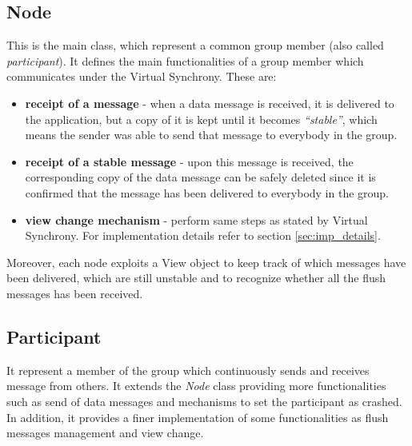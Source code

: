 \documentclass[11pt]{article}
\begin{document}
	\subsection{Node}
	This is the main class, which represent a common group member (also called \textit{participant}). It defines the main functionalities of a group member which communicates under the Virtual Synchrony. These are:
	\begin{itemize}
		\item \textbf{receipt of a message} - when a data message is received, it is delivered to the application, but a copy of it is kept until it becomes \textit{``stable''}, which means the sender was able to send that message to everybody in the group.
		\item \textbf{receipt of a stable message} - upon this message is received, the corresponding copy of the data message can be safely deleted since it is confirmed that the message has been delivered to everybody in the group.
		\item \textbf{view change mechanism} - perform same steps as stated by Virtual Synchrony. For implementation details refer to section \ref{sec:imp_details}.
	\end{itemize}
	Moreover, each node exploits a View object to keep track of which messages have been delivered, which are still unstable and to recognize whether all the flush messages has been received.
	
	\subsection{Participant}
	It represent a member of the group which continuously sends and receives message from others. It extends the \textit{Node} class providing more functionalities such as send of data messages and mechanisms to set the participant as crashed. In addition, it provides a finer implementation of some functionalities as flush messages management and view change.
	
\end{document}
